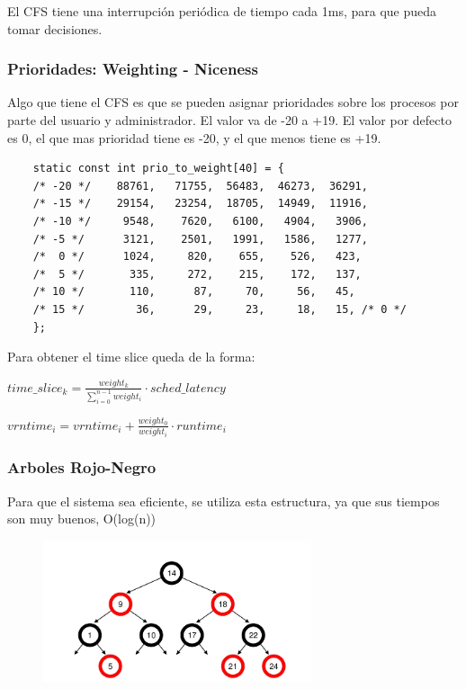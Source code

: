 \documentclass[titlepage,a4paper]{article}
\begin{document}
El CFS tiene una interrupción periódica de tiempo cada 1ms, para que pueda tomar decisiones.

\subsubsection*{Prioridades: Weighting - Niceness}
Algo que tiene el CFS es que se pueden asignar prioridades sobre los procesos por parte del usuario y administrador. El valor va de -20 a +19. El valor por defecto es 0, el que mas prioridad tiene es -20, y el que menos tiene es +19.

\begin{verbatim}
    static const int prio_to_weight[40] = {
    /* -20 */    88761,   71755,  56483,  46273,  36291,
    /* -15 */    29154,   23254,  18705,  14949,  11916,
    /* -10 */     9548,    7620,   6100,   4904,   3906,
    /* -5 */      3121,    2501,   1991,   1586,   1277,
    /*  0 */      1024,     820,    655,    526,   423,
    /*  5 */       335,     272,    215,    172,   137,
    /* 10 */       110,      87,     70,     56,   45,
    /* 15 */        36,      29,     23,     18,   15, /* 0 */
    };
\end{verbatim}

Para obtener el time slice queda de la forma:
\begin{center}
    \begin{math}
        time\_slice_{k} = \frac{weight_{k}}{\sum^{n-1}_{i=0}weight_{i}} \cdot sched\_latency
    \end{math}  
\end{center}

\begin{center}
    \begin{math}
        vrntime_{i} = vrntime_{i} + \frac{weight_{0}}{weight_{i}} \cdot runtime_{i}
    \end{math}  
\end{center}

\subsubsection*{Arboles Rojo-Negro}
Para que el sistema sea eficiente, se utiliza esta estructura, ya que sus tiempos son muy buenos, O(log(n))

\begin{figure}[!htb]
    \centering
    \includegraphics[width=0.7\textwidth]{ImagenesApunte/arbolRojoNegro.jpg}
\end{figure}
\end{document}
